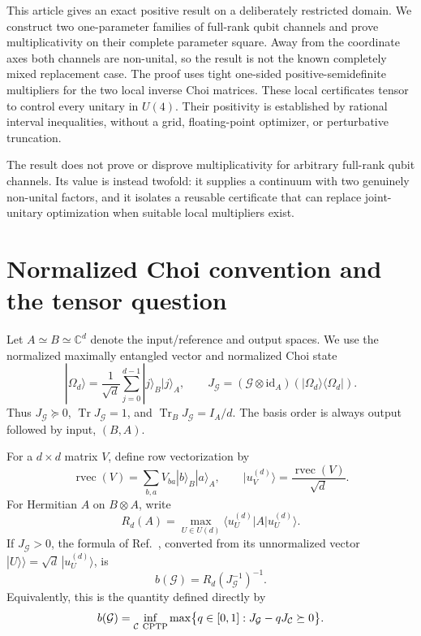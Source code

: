 \documentclass[11pt,a4paper]{article}
\theoremstyle{remark}
\DeclareMathOperator{\Tr}{Tr}
\DeclareMathOperator{\rvec}{rvec}
\newcommand{\cG}{\mathcal G}
\newcommand{\cC}{\mathcal C}
\newcommand{\id}{\mathrm{id}}
\newcommand{\I}{I}
\newcommand{\succeqz}{\succeq 0}
\begin{document}
This article gives an exact positive result on a deliberately restricted
domain.  We construct two one-parameter families of full-rank qubit channels
and prove multiplicativity on their complete parameter square.  Away from the
coordinate axes both channels are non-unital, so the result is not the known
completely mixed replacement case.  The proof uses tight one-sided
positive-semidefinite multipliers for the two local inverse Choi matrices.
These local certificates tensor to control every unitary in $U(4)$.  Their
positivity is established by rational interval inequalities, without a grid,
floating-point optimizer, or perturbative truncation.

The result does not prove or disprove multiplicativity for arbitrary
full-rank qubit channels.  Its value is instead twofold: it supplies a
continuum with two genuinely non-unital factors, and it isolates a reusable
certificate that can replace joint-unitary optimization when suitable local
multipliers exist.

\section{Normalized Choi convention and the tensor question}
\label{sec:setup}

Let $A\simeq B\simeq\mathbb C^d$ denote the input/reference and output
spaces.  We use the normalized maximally entangled vector and normalized Choi
state
\begin{equation}
 |\Omega_d\rangle=\frac{1}{\sqrt d}\sum_{j=0}^{d-1}|j\rangle_B|j\rangle_A,
 \qquad
 J_{\cG}=(\cG\otimes\id_A)(|\Omega_d\rangle\langle\Omega_d|).
 \label{eq:choi}
\end{equation}
Thus $J_{\cG}\succeqz$, $\Tr J_{\cG}=1$, and
$\Tr_BJ_{\cG}=\I_A/d$.  The basis order is always output followed by input,
$(B,A)$.

For a $d\times d$ matrix $V$, define row vectorization by
\begin{equation}
 \rvec(V)=\sum_{b,a}V_{ba}|b\rangle_B|a\rangle_A,
 \qquad |u_V^{(d)}\rangle=\frac{\rvec(V)}{\sqrt d}.
 \label{eq:rvec}
\end{equation}
For Hermitian $A$ on $B\otimes A$, write
\begin{equation}
 R_d(A)=\max_{U\in U(d)}
 \langle u_U^{(d)}|A|u_U^{(d)}\rangle.
 \label{eq:radius}
\end{equation}
If $J_{\cG}>0$, the formula of Ref.~\cite{Puchala2015}, converted from its
unnormalized vector $|U\rangle\!\rangle=\sqrt d\,|u_U^{(d)}\rangle$, is
\begin{equation}
 b(\cG)=R_d(J_{\cG}^{-1})^{-1}.
 \label{eq:boundariness}
\end{equation}
Equivalently, this is the quantity defined directly by
\begin{equation}
 b(\cG)=\inf_{\cC\ {\rm CPTP}}
 \max\bigl\{q\in[0,1]:J_{\cG}-qJ_{\cC}\succeqz\bigr\}.
 \label{eq:direct-b}
\end{equation}
\end{document}
